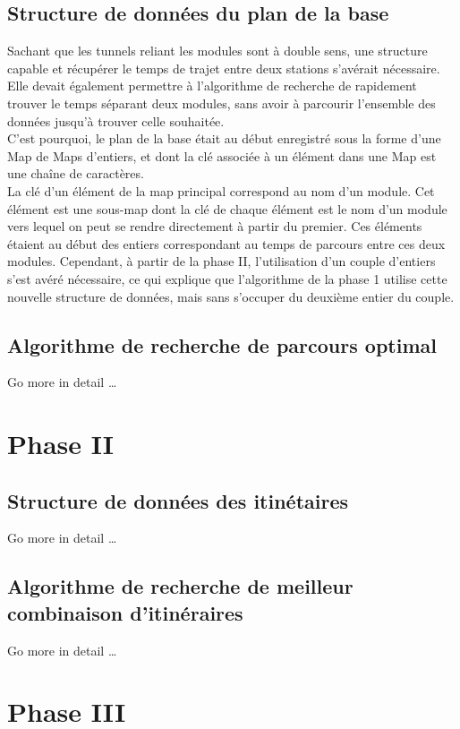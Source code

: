 \documentclass[11pt, a4paper, twoside, titlepage]{article}
\begin{document}
\subsection{Structure de données du plan de la base}
Sachant que les tunnels reliant les modules sont à double sens, une structure capable et récupérer le temps de trajet entre deux stations s'avérait nécessaire. Elle devait également permettre à l'algorithme de recherche de rapidement trouver le temps séparant deux modules, sans avoir à parcourir l'ensemble des données jusqu'à trouver celle souhaitée.\\
C'est pourquoi, le plan de la base était au début enregistré sous la forme d'une Map de Maps d'entiers, et dont la clé associée à un élément dans une Map est une chaîne de caractères.\\

La clé d'un élément de la map principal correspond au nom d'un module. Cet élément est une sous-map dont la clé de chaque élément est le nom d'un module vers lequel on peut se rendre directement à partir du premier. Ces éléments étaient au début des entiers correspondant au temps de parcours entre ces deux modules. Cependant, à partir de la phase II, l'utilisation d'un couple d'entiers s'est avéré nécessaire, ce qui explique que l'algorithme de la phase 1 utilise cette nouvelle structure de données, mais sans s'occuper du deuxième entier du couple.

\subsection{Algorithme de recherche de parcours optimal}
Go more in detail \ldots


\newpage
\section{Phase II}

\subsection{Structure de données des itinétaires}
Go more in detail \ldots

\subsection{Algorithme de recherche de meilleur combinaison d'itinéraires}
Go more in detail \ldots


\newpage
\section{Phase III}
\end{document}
